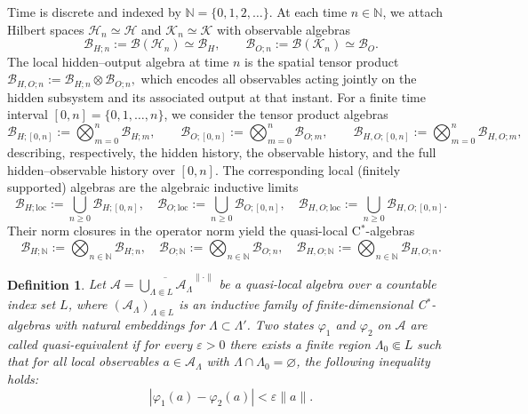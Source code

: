 \documentclass[11pt, reco]{article}
\newtheorem{definition}[theorem]{Definition}
\begin{document}
Time is discrete and indexed by \(\mathbb{N}=\{0,1,2,\dots\}\). At each time \(n\in\mathbb{N}\), we attach Hilbert spaces \(\mathcal{H}_n\simeq\mathcal{H}\) and \(\mathcal{K}_n\simeq\mathcal{K}\) with observable algebras
\[
\mathcal{B}_{H;n} := \mathcal{B}(\mathcal{H}_n)\simeq\mathcal{B}_H,\qquad
\mathcal{B}_{O;n} := \mathcal{B}(\mathcal{K}_n)\simeq\mathcal{B}_O.
\]
The local hidden–output algebra at time \(n\) is the spatial tensor product
\(\mathcal{B}_{H,O;n} := \mathcal{B}_{H;n}\otimes\mathcal{B}_{O;n},\)
which encodes all observables acting jointly on the hidden subsystem and its associated output at that instant.
For a finite time interval \([0,n]=\{0,1,\dots,n\}\), we consider the tensor product algebras
\[
\mathcal{B}_{H;[0,n]} := \bigotimes_{m=0}^n \mathcal{B}_{H;m},\qquad
\mathcal{B}_{O;[0,n]} := \bigotimes_{m=0}^n \mathcal{B}_{O;m},\qquad
\mathcal{B}_{H,O;[0,n]} := \bigotimes_{m=0}^n \mathcal{B}_{H,O;m},
\]
describing, respectively, the hidden history, the observable history, and the full hidden–observable history over \([0,n]\). The corresponding local (finitely supported) algebras are the algebraic inductive limits
\[
\mathcal{B}_{H;\mathrm{loc}} := \bigcup_{n\ge 0} \mathcal{B}_{H;[0,n]},\quad
\mathcal{B}_{O;\mathrm{loc}} := \bigcup_{n\ge 0} \mathcal{B}_{O;[0,n]},\quad
\mathcal{B}_{H,O;\mathrm{loc}} := \bigcup_{n\ge 0} \mathcal{B}_{H,O;[0,n]}.
\]
Their norm closures in the operator norm yield the quasi-local C\(^*\)-algebras
\[
\mathcal{B}_{H;\mathbb{N}} :=  \bigotimes_{n\in\mathbb{N}}\mathcal{B}_{H;n},\quad
\mathcal{B}_{O;\mathbb{N}} := \bigotimes_{n\in\mathbb{N}}\mathcal{B}_{O;n},\quad
\mathcal{B}_{H,O;\mathbb{N}} := \bigotimes_{n\in\mathbb{N}}\mathcal{B}_{H,O;n}.
\]
\begin{definition}\label{def:quasi-equivalence}
Let $\mathcal{A} = \overline{\bigcup_{\Lambda \Subset L} \mathcal{A}_\Lambda}^{\|\cdot\|}$ be a quasi-local algebra over a countable index set $L$, where $(\mathcal{A}_\Lambda)_{\Lambda \Subset L}$ is an inductive family of finite-dimensional C$^*$-algebras with natural embeddings for $\Lambda \subset \Lambda'$.
Two states $\varphi_1$ and $\varphi_2$ on $\mathcal{A}$ are called \emph{quasi-equivalent} if for every $\varepsilon > 0$ there exists a finite region $\Lambda_0 \Subset L$ such that for all local observables $a \in \mathcal{A}_\Lambda$ with $\Lambda \cap \Lambda_0 = \varnothing$, the following inequality holds:
\begin{equation}\label{eq:quasi-equiv-condition}
|\varphi_1(a) - \varphi_2(a)| < \varepsilon \|a\|.
\end{equation}
\end{definition}
\end{document}
